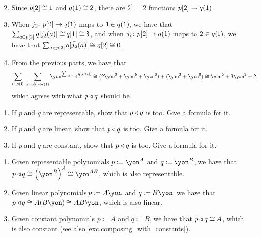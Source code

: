 \documentclass[Book-Poly]{subfiles}
\begin{document}
\begin{exercise}
\begin{solution}
\begin{enumerate}
\[    \]
    \item Since $p[2] \cong \textsf{1}$ and $q(\textsf{1}) \cong \textsf{2}$, there are $2^1 = 2$ functions $p[2] \to q(\textsf{1})$.
    \item When $j_2 \colon p[2] \to q(\textsf{1})$ maps to $1 \in q(\textsf{1})$, we have that $\sum_{a \in p[2]} q[\bar{j_2}(a)] \cong q[1] \cong \textsf{3}$, and when $\bar{j_2} \colon p[2] \to q(\textsf{1})$ maps to $2 \in q(\textsf{1})$, we have that $\sum_{a \in p[2]} q[\bar{j_2}(a)] \cong q[2] \cong \textsf{0}$.
    \item From the previous parts, we have that
    \[
        \sum_{i\in p(\1)}\;\sum_{\bar{j}\colon p[i]\to q(\1)}\yon^{\sum_{a\in p[i]}q[j_i(a)]} \iso (\2\yon^\3 + \yon^\6 + \yon^\0) + (\yon^\3 + \yon^\0) \iso \yon^\6 + \3\yon^\3 + \2,
    \]
    which agrees with what $p \mathbin{\triangleleft} q$ should be.
\end{enumerate}
\end{solution}
\end{exercise}

\begin{exercise}\label{exc.composites_of_specials}
\begin{enumerate}
	\item If $p$ and $q$ are representable, show that $p\mathbin{\triangleleft} q$ is too. Give a formula for it.
	\item If $p$ and $q$ are linear, show that $p\mathbin{\triangleleft} q$ is too. Give a formula for it.
	\item If $p$ and $q$ are constant, show that $p\mathbin{\triangleleft} q$ is too. Give a formula for it.
\qedhere
\end{enumerate}
\begin{solution}
\begin{enumerate}
	\item Given representable polynomials $p \coloneqq \yon^A$ and $q \coloneqq \yon^B$, we have that $p \tri q \iso \left(\yon^B\right)^A \iso \yon^{AB}$, which is also representable.
	\item Given linear polynomials $p \coloneqq A\yon$ and $q \coloneqq B\yon$, we have that $p \tri q \iso A(B\yon) \iso AB\yon$, which is also linear.
	\item Given constant polynomials $p \coloneqq A$ and $q \coloneqq B$, we have that $p \mathbin{\triangleleft} q \cong A$, which is also constant (see also \cref{exc.composing_with_constants}).
\end{enumerate}
\end{solution}
\end{exercise}
\end{document}
